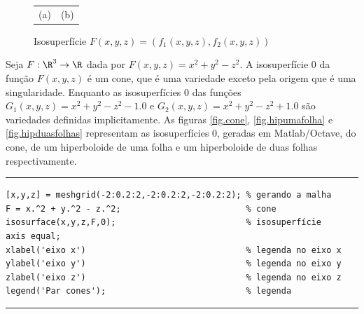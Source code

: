 \begin{figure}[htpb]
\begin{tabular}{cc}
\hspace{-3.3cm}(a) & \hspace{-3.2cm}(b) 
\end{tabular}
\caption{Isosuperfície $F(x,y,z)=(f_1(x,y,z),f_2(x,y,z))$} 
\label{fig.isosurfr3r2}
\end{figure}

\newpage

 Seja $F:\R^3 \rightarrow \R$ dada por $F(x,y,z) = x^2 + y^2 - z^2$. 
A isosuperfície 0 da função $F(x,y,z)$ é um cone, que é uma variedade exceto pela origem que é uma singularidade. 
Enquanto as isosuperfícies 0 das funções  $G_1(x,y,z) = x^2 + y^2 - z^2 - 1.0$ e $G_2(x,y,z)=x^2 + y^2 - z^2 + 1.0$ são variedades definidas implicitamente. 
As figuras \ref{fig.cone}, \ref{fig.hipumafolha} e \ref{fig.hipduasfolhas} representam as isosuperfícies 0, geradas em Matlab/Octave, do cone, de um hiperboloide de uma folha e um hiperboloide de duas folhas respectivamente.

\begin{Codigo}[htpb]
\noindent\rule{13cm}{1.pt}
\begin{verbatim}
[x,y,z] = meshgrid(-2:0.2:2,-2:0.2:2,-2:0.2:2); % gerando a malha
F = x.^2 + y.^2 - z.^2;                         % cone
isosurface(x,y,z,F,0);                          % isosuperfície
axis equal;
xlabel('eixo x')                                % legenda no eixo x
ylabel('eixo y')                                % legenda no eixo y
zlabel('eixo z')                                % legenda no eixo z
legend('Par cones');                            % legenda 
\end{verbatim}
\caption{Código utilizado para gerar a figura \ref{fig.cone}} 
\noindent\rule{13cm}{1.pt}
\label{supcurvanivelb}
\end{Codigo}

